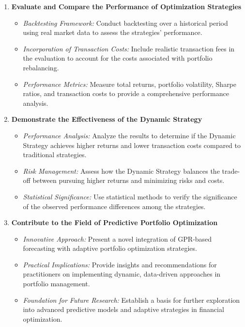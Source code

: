 \begin{enumerate}
    \item \textbf{Evaluate and Compare the Performance of Optimization Strategies}
    \begin{itemize}
        \item \emph{Backtesting Framework:} Conduct backtesting over a historical period using real market data to assess the strategies' performance.
        \item \emph{Incorporation of Transaction Costs:} Include realistic transaction fees in the evaluation to account for the costs associated with portfolio rebalancing.
        \item \emph{Performance Metrics:} Measure total returns, portfolio volatility, Sharpe ratios, and transaction costs to provide a comprehensive performance analysis.
    \end{itemize}
    
    \item \textbf{Demonstrate the Effectiveness of the Dynamic Strategy}
    \begin{itemize}
        \item \emph{Performance Analysis:} Analyze the results to determine if the Dynamic Strategy achieves higher returns and lower transaction costs compared to traditional strategies.
        \item \emph{Risk Management:} Assess how the Dynamic Strategy balances the trade-off between pursuing higher returns and minimizing risks and costs.
        \item \emph{Statistical Significance:} Use statistical methods to verify the significance of the observed performance differences among the strategies.
    \end{itemize}
    
    \item \textbf{Contribute to the Field of Predictive Portfolio Optimization}
    \begin{itemize}
        \item \emph{Innovative Approach:} Present a novel integration of GPR-based forecasting with adaptive portfolio optimization strategies.
        \item \emph{Practical Implications:} Provide insights and recommendations for practitioners on implementing dynamic, data-driven approaches in portfolio management.
        \item \emph{Foundation for Future Research:} Establish a basis for further exploration into advanced predictive models and adaptive strategies in financial optimization.
    \end{itemize}
\end{enumerate}

